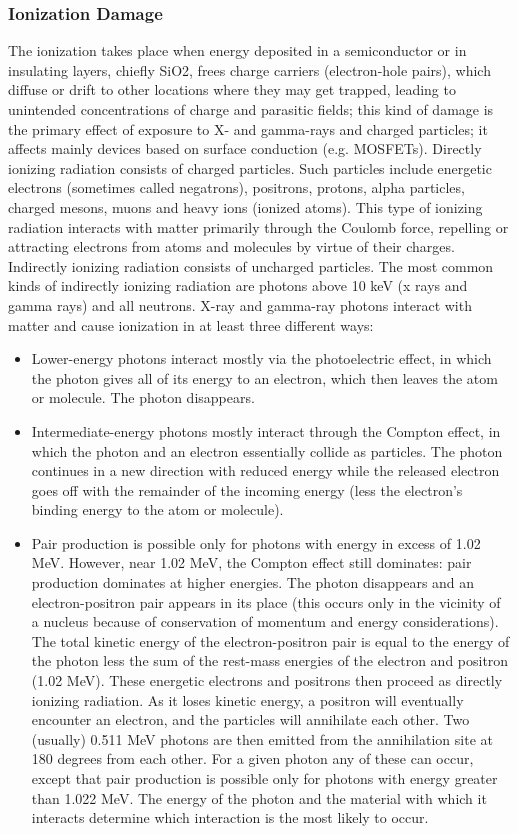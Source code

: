\documentclass[./dissertation.tex]{subfiles}
\begin{document}
\subsubsection{Ionization Damage}
The ionization takes place when energy deposited in a semiconductor or in insulating
layers, chiefly SiO2, frees charge carriers (electron-hole pairs), which diffuse or drift
to other locations where they may get trapped, leading to unintended concentrations
of charge and parasitic fields; this kind of damage is the primary effect of exposure
to X- and gamma-rays and charged particles; it affects mainly devices based on surface conduction (e.g. MOSFETs)\cite{bib1}. Directly ionizing radiation consists of charged
particles. Such particles include energetic electrons (sometimes called negatrons),
positrons, protons, alpha particles, charged mesons, muons and heavy ions (ionized
atoms). This type of ionizing radiation interacts with matter primarily through the
Coulomb force, repelling or attracting electrons from atoms and molecules by virtue of
their charges. Indirectly ionizing radiation consists of uncharged particles. The most
common kinds of indirectly ionizing radiation are photons above 10 keV (x rays and
gamma rays) and all neutrons. X-ray and gamma-ray photons interact with matter
and cause ionization in at least three different ways:
\begin{itemize}

\item Lower-energy photons interact mostly via the photoelectric effect, in which the
photon gives all of its energy to an electron, which then leaves the atom or
molecule. The photon disappears.
\item Intermediate-energy photons mostly interact through the Compton effect, in
which the photon and an electron essentially collide as particles. The photon
continues in a new direction with reduced energy while the released electron
goes off with the remainder of the incoming energy (less the electron's binding
energy to the atom or molecule).
\item Pair production is possible only for photons with energy in excess of 1.02 MeV.
However, near 1.02 MeV, the Compton effect still dominates: pair production
dominates at higher energies. The photon disappears and an electron-positron
pair appears in its place (this occurs only in the vicinity of a nucleus because
of conservation of momentum and energy considerations). The total kinetic
energy of the electron-positron pair is equal to the energy of the photon less the
sum of the rest-mass energies of the electron and positron (1.02 MeV). These
energetic electrons and positrons then proceed as directly ionizing radiation. As
it loses kinetic energy, a positron will eventually encounter an electron, and the
particles will annihilate each other. Two (usually) 0.511 MeV photons are then
emitted from the annihilation site at 180 degrees from each other. For a given
photon any of these can occur, except that pair production is possible only for
photons with energy greater than 1.022 MeV. The energy of the photon and the
material with which it interacts determine which interaction is the most likely
to occur\cite{bib8}.
\end{itemize}
\end{document}
